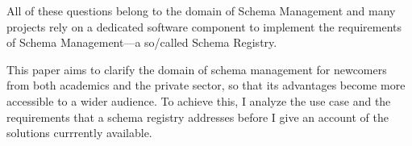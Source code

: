 All of these questions belong to the domain of Schema Management and many projects rely on a dedicated software component to implement the requirements of Schema Management---a so\-/called Schema Registry.






This paper aims to clarify the domain of schema management for newcomers from both academics and the private sector, so that its advantages become more accessible to a wider audience. To achieve this, I analyze the use case and the requirements that a schema registry addresses before I give an account of the solutions currrently available.

